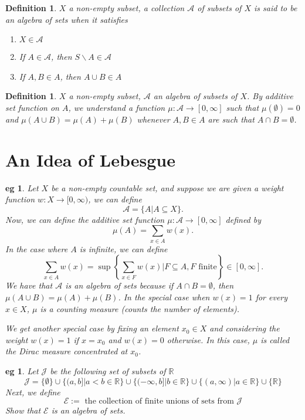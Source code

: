 \documentclass[letterpaper, 12pt]{article}
\newcommand{\fin}{\qquad \quad \hfill \framebox[1.75mm][l]{\,}}
\newcommand{\cE}{\mathcal{E}}
\newcommand{\cJ} {\mathcal{J}}
\newcommand{\bR}{\mathbb{R}}
\newcommand{\sA}{\mathcal{A}}
\theoremstyle{stdthm}
\theoremstyle{stddef}
\newtheorem{defn}[thm]{Definition}
\newtheorem{eg}[thm]{eg} %
\theoremstyle{stdnonum}
\theoremstyle{stdqands}
\theoremstyle{stdbold}
\begin{document}
\begin{defn}
$X$ a non-empty subset, a collection $\sA$ of subsets of $X$ is said to be an algebra of sets when it satisfies
\begin{enumerate}
\item $X \in \sA$
\item If $A \in \sA$, then $S\backslash A \in \sA$ 
\item If $A,B \in A$, then $A\cup B \in A$
\end{enumerate}
\end{defn}

\begin{defn}
$X$ a non-empty subset, $\sA$ an algebra of subsets of $X$. By additive set function on $A$, we understand a function $\mu: \sA \rightarrow [0,\infty]$ such that $\mu(\emptyset) = 0$ and $\mu(A\cup B) = \mu(A) + \mu(B)$ whenever $A,B\in A$ are such that $A\cap B = \emptyset$. 
\end{defn}

\newpage

\section{An Idea of Lebesgue} 

\begin{eg}
Let $X$ be a non-empty countable set, and suppose we are given a weight function $w:X\rightarrow [0,\infty)$, we can define 
\[ \sA = \{ A|A\subseteq X \}.\]
Now, we can define the additive set function $\mu:\sA \rightarrow [0,\infty]$ defined by 
\[\mu(A) = \sum_{x\in A} w(x). \]
In the case where $A$ is infinite, we can define 
\[\sum_{x\in A} w(x) = \sup \left\{\sum_{x\in F}w(x)| F\subseteq A, F \text{ finite} \right\} \in [0,\infty]. \]
We have that $\sA$ is an algebra of sets because if $A\cap B = \emptyset$, then $\mu(A\cup B) = \mu(A) + \mu(B)$. %
In the special case when $w(x) = 1$ for every $x \in X$, $\mu$ is a counting measure (counts the number of elements).  

We get another special case by fixing an element $x_0\in X$ and considering the weight $w(x) = 1$ if $x=x_0$ and $w(x) = 0$ otherwise. In this case, $\mu$ is called the Dirac measure concentrated at $x_0$. 
\end{eg}

\begin{eg}
Let $\cJ$ be the following set of subsets of $\bR$
\[ \cJ = \{\emptyset\} \cup \{ (a,b]|a<b \in \bR\} \cup \{(-\infty ,b]|b\in \bR\} \cup \{(a,\infty)|a \in \bR \} \cup \{ \bR\} \]
Next, we define
\[ \cE := \text{ the collection of finite unions of sets from } \cJ \]
Show that $\cE$ is an algebra of sets. 
\end{eg}
\end{document}
